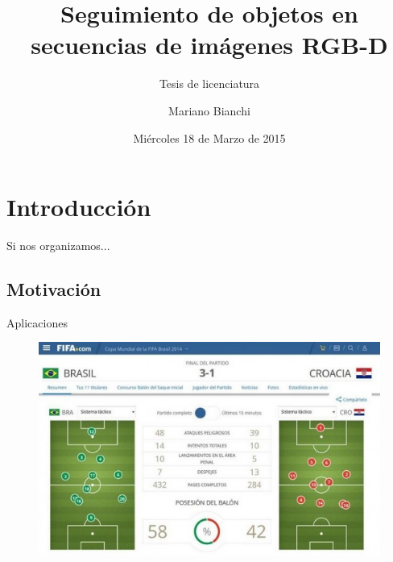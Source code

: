\documentclass[]{beamer}
\title{Seguimiento de objetos en secuencias de imágenes RGB-D}
\subtitle{Tesis de licenciatura}
\institute{Facultad de Ciencias Exactas y Naturales}
\date[18/03/15]{Miércoles 18 de Marzo de 2015}
\author[Mariano Bianchi]{Mariano Bianchi}
\begin{document}
\maketitle



\section{Introducción}
\begin{frame}[t]{Si nos organizamos...}
    \tableofcontents
\end{frame}

\subsection{Motivación}
\begin{frame}{Aplicaciones} %
    \begin{figure}[t]
        \centering
        \includegraphics[scale=0.5]{img/estadistica.jpg}
    \end{figure}
\end{frame}
\end{document}
